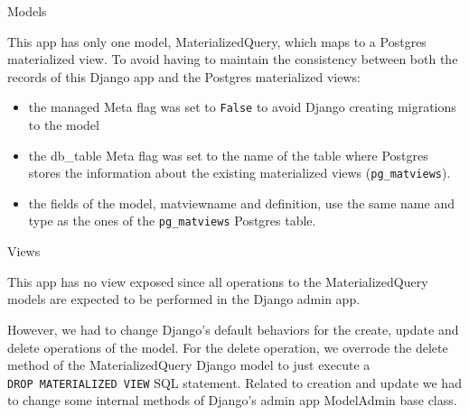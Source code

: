 \documentclass[
]{book}
\providecommand{\tightlist}{%
  \setlength{\itemsep}{0pt}\setlength{\parskip}{0pt}}
\begin{document}
Models

This app has only one model, MaterializedQuery, which maps to a Postgres materialized view.
To avoid having to maintain the consistency between both the records of this Django app and the Postgres materialized views:

\begin{itemize}
\tightlist
\item
  the managed Meta flag was set to \texttt{False} to avoid Django creating migrations to the model
\item
  the db\_table Meta flag was set to the name of the table where Postgres stores the information about the existing materialized views (\texttt{pg\_matviews}).
\item
  the fields of the model, matviewname and definition, use the same name and type as the ones of the \texttt{pg\_matviews} Postgres table.
\end{itemize}

Views

This app has no view exposed since all operations to the MaterializedQuery models are expected to be performed in the Django admin app.

However, we had to change Django's default behaviors for the create, update and delete operations of the model.
For the delete operation, we overrode the delete method of the MaterializedQuery Django model to just execute a \texttt{DROP\ MATERIALIZED\ VIEW} SQL statement.
Related to creation and update we had to change some internal methods of Django's admin app ModelAdmin base class.
\end{document}
